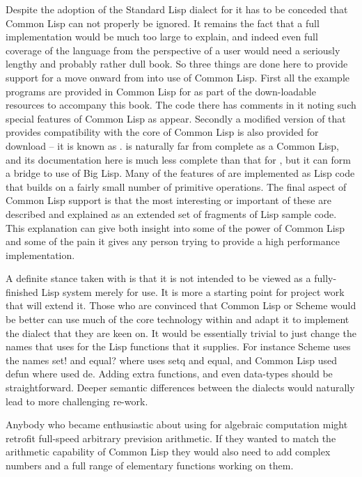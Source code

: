 Despite the adoption of the Standard Lisp dialect for \vsl{} it has to be
conceded that Common Lisp can not properly be ignored. It remains the fact that
a full implementation would be much too large to explain, and indeed even
full coverage of the language from the perspective of a user would need
a seriously lengthy and probably rather dull book. So three things are
done here to provide support for a move onward from \vsl{} into use of
Common Lisp. First all the example programs are provided in Common Lisp
for as part of the down-loadable resources to accompany this book. The
code there has comments in it noting such special features of Common Lisp
as appear. Secondly a modified version of \vsl{} that provides compatibility
with the core of Common Lisp is also provided for download -- it is known
as \vcl. \vcl{} is naturally far from complete as a Common Lisp, and its
documentation here is much less complete than that for \vsl{}, but it can form
a bridge to use of Big Lisp. Many of the features of \vsl{} are implemented
as Lisp code that builds on a fairly small number of primitive operations.
The final aspect of Common Lisp support is that the most interesting or
important of these are described and explained as an extended set of
fragments of Lisp sample code. This explanation can give both insight into
some of the power of Common Lisp and some of the pain it gives any
person trying to provide a high performance implementation.

A definite stance taken with \vsl{} is that it is not intended to be
viewed as a fully-finished Lisp system merely for use. It is more a starting
point for project work that will extend it. Those who are convinced that
Common Lisp or Scheme would be better can use much of the core technology
within \vsl{} and adapt it to implement the dialect that they are keen on.
It would be essentially trivial to just change the names that \vsl{} uses
for the Lisp functions that it supplies. For instance Scheme uses the names
{\tx set!} and {\tx equal?} where \vsl{} uses {\tx setq} and {\tx equal},
and Common Lisp used {\tx defun} where \vsl{} used {\tx de}. Adding extra
functions, and even data-types should be straightforward. Deeper semantic
differences between the dialects would naturally lead to more challenging
re-work.

Anybody who became enthusiastic about using \vsl{} for algebraic computation
might retrofit full-speed arbitrary prevision arithmetic. If they wanted to match the
arithmetic capability of Common Lisp they would also need to add complex
numbers and a full range of elementary functions working on them.

